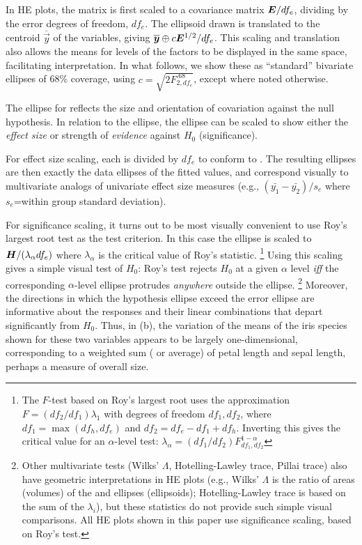 In HE plots, the  matrix is first scaled to a covariance matrix
$\bm{E}/df_e$, dividing by the error degrees of freedom, $df_e$.
The ellipsoid drawn is
translated to the centroid $\overline{\vec{y}}$ of the variables,
giving $\overline{\bm{y}} \oplus c \bm{E}^{1/2}/df_e$.
This scaling and translation
also allows the means for levels of the factors
to be displayed in the same space,
facilitating interpretation.
In what follows, we show these as
``standard'' bivariate ellipses of 68\% coverage, 
using $c=\sqrt{2 F_{2, df_e}^{.68}}$, except where noted otherwise.

The ellipse for  reflects the size and orientation of covariation
against the null hypothesis. 
In relation to the  ellipse, the  ellipse
can be scaled to show either the \emph{effect size} or strength of
\emph{evidence} against $H_0$ (significance).

For effect size scaling, each  is divided by $df_e$ to conform
to .  The resulting ellipses are then exactly the data ellipses
of the fitted values, and correspond visually to multivariate analogs of
univariate effect size measures (e.g., $(\bar{y_1}-\bar{y_2})/s_e$
where $s_e$=within group standard deviation).

For significance scaling, it turns out to be most visually convenient to
use Roy's largest root test as the test criterion.
In this case
the  ellipse is scaled to $\bm{H}/(\lambda_\alpha df_e)$
where $\lambda_\alpha$ is the critical value of Roy's statistic.%
\footnote{
The $F$-test based on Roy's largest root uses the approximation
$ F = (df_2 / df_1) \lambda_1$ with degrees of freedom $df_1, df_2$,
where $df_1 = \max (df_h, df_e)$ and $df_2 = df_e - df_1 + df_h$.
Inverting this gives the critical value for an $\alpha$-level test:
$\lambda_\alpha = (df_1/df_2) F^{1-\alpha}_{df_1,df_2}$
}
Using this scaling gives a simple visual test of
$H_0$: Roy's test rejects $H_0$ at a given $\alpha$ level \emph{iff}
the corresponding $\alpha$-level  ellipse protrudes \emph{anywhere} outside the 
ellipse.%
\footnote{Other multivariate tests (Wilks' $\Lambda$, Hotelling-Lawley trace,
Pillai trace) also have geometric interpretations
in HE plots (e.g.,  Wilks' $\Lambda$ is the ratio of areas (volumes)
of the  and  ellipses (ellipsoids); Hotelling-Lawley trace
is based on the sum of the $\lambda_i$), but these statistics do not provide
such simple visual comparisons. All HE plots shown in this paper use
significance scaling, based on Roy's test.
}
Moreover, the directions in which the hypothesis ellipse exceed the error ellipse
are informative about the responses and their linear combinations that depart significantly
from $H_0$.  Thus, in (b), the variation of the means of the iris species
shown for these two variables
appears to be largely one-dimensional, corresponding to a weighted sum ( or average) of petal length and
sepal length, perhaps a measure of overall size.


